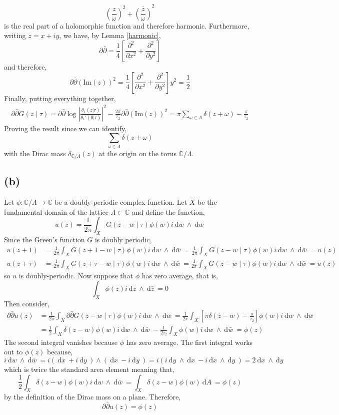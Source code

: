 \documentclass[12pt]{extarticle}
\newcommand{\C}{\mathbb{C}}
\renewcommand{\Im}[1]{\mathrm{Im}(#1)}
\renewcommand{\d}[1]{\: \mathrm{d}#1 \:}
\newcommand{\parsq}[2]{\frac{\partial^2{#1}}{\partial{#2}^2}}
\theoremstyle{definition}
\begin{document}
\[ \left( \frac{z}{\omega} \right)^2 + \overline{\left( \frac{z}{\omega} \right)}^2 \]
is the real part of a holomorphic function and therefore harmonic. Furthermore, writing $z = x + iy$, we have, by Lemma \ref{harmonic}, 
\[ \partial \bar{\partial} = \frac{1}{4} \left[ \parsq{}{x} + \parsq{}{y} \right] \]
and therefore,
\[ \partial \bar{\partial} (\Im{z})^2 = \frac{1}{4} \left[ \parsq{}{x} + \parsq{}{y} \right] y^2 = \frac{1}{2} \]
Finally, putting everything together,
\begin{align*}
\partial \bar{\partial} G(z \mid \tau) = \partial \bar{\partial} \log{\left| \frac{\theta_1(z | \tau)}{\theta_1'(0 | \tau)} \right|^2} - \frac{2 \pi}{\tau_2} \partial \bar{\partial} (\Im{z})^2 = \pi \sum_{\omega \in \Lambda} \delta(z + \omega) -  \frac{\pi}{\tau_2} 
\end{align*}
Proving the result since we can identify,
\[ \sum_{\omega \in \Lambda} \delta(z + \omega) \]
with the Dirac mass $\delta_{\C / \Lambda}(z)$ at the origin on the torus $\C / \Lambda$. 

\subsection*{(b)}

Let $\phi : \C / \Lambda \to \C$ be a doubly-periodic complex function. Let $X$ be the fundamental domain of the lattice $\Lambda \subset \C$ and define the function,
\[ u(z) = \frac{1}{2 \pi} \int_X G(z - w \mid \tau) \phi(w) i \d{w} \wedge \d{\bar{w}} \]
Since the Green's function $G$ is doubly periodic,
\begin{align*}
u(z + 1) & = \frac{1}{2 \pi} \int_X G(z + 1 - w \mid \tau) \phi(w) i \d{w} \wedge \d{\bar{w}} = \frac{1}{2 \pi} \int_X G(z - w \mid \tau) \phi(w) i \d{w} \wedge \d{\bar{w}} = u(z)
\\
u(z + \tau) & = \frac{1}{2 \pi} \int_X G(z + \tau - w \mid \tau) \phi(w) i \d{w} \wedge \d{\bar{w}} = \frac{1}{2 \pi} \int_X G(z - w \mid \tau) \phi(w) i \d{w} \wedge \d{\bar{w}} = u(z)
\end{align*}
so $u$ is doubly-periodic. Now suppose that $\phi$ has zero average, that is,
\[ \int_X \phi(z) i \d{z} \wedge \d{\bar{z}} = 0 \]
Then consider,
\begin{align*}
\partial \bar{\partial} u(z) & = \frac{1}{2 \pi} \int_X \partial \bar{\partial} G(z - w \mid \tau) \phi(w) i \d{w} \wedge \d{\bar{w}} = \frac{1}{2 \pi} \int_X \left[ \pi \delta(z - w) - \frac{\pi}{\tau_2} \right] \phi(w) i \d{w} \wedge \d{\bar{w}}
\\
& = \frac{1}{2} \int_X \delta(z - w) \phi(w) i \d{w} \wedge \d{\bar{w}} - \frac{1}{2 \tau_2} \int_X \phi(w) i \d{w} \wedge \d{\bar{w}} = \phi(z)
\end{align*}
The second integral vanishes because $\phi$ has zero average. The first integral works out to $\phi(z)$ because,
\[ i \d{w} \wedge \d{\bar{w}} = i (\d{x} + i \d{y}) \wedge (\d{x} - i \d{y}) = i (i \d{y} \wedge \d{x} - i \d{x} \wedge \d{y}) = 2 \d{x} \wedge \d{y} \]
which is twice the standard area element
meaning that,
\[ \frac{1}{2} \int_X \delta(z - w) \phi(w) i \d{w} \wedge \d{\bar{w}} = \int_X \delta(z - w) \phi(w) \d{A} = \phi(z) \]
by the definition of the Dirac mass on a plane. Therefore,
\[ \partial \bar{\partial} u(z) = \phi(z) \]
\end{document}
